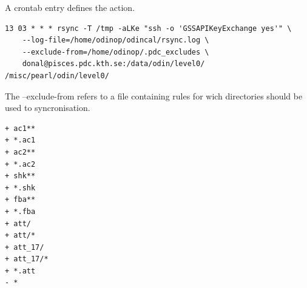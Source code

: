 \documentclass[12pt]{article}
\begin{document}
A crontab entry defines the action.
\begin{verbatim}
13 03 * * * rsync -T /tmp -aLKe "ssh -o 'GSSAPIKeyExchange yes'" \
    --log-file=/home/odinop/odincal/rsync.log \
    --exclude-from=/home/odinop/.pdc_excludes \
    donal@pisces.pdc.kth.se:/data/odin/level0/ /misc/pearl/odin/level0/
\end{verbatim}

The --exclude-from refers to a file containing rules for wich directories should be used to syncronisation.

\begin{verbatim}
+ ac1**
+ *.ac1
+ ac2**
+ *.ac2
+ shk**
+ *.shk
+ fba**
+ *.fba
+ att/
+ att/*
+ att_17/
+ att_17/*
+ *.att
- *
\end{verbatim}
\end{document}
